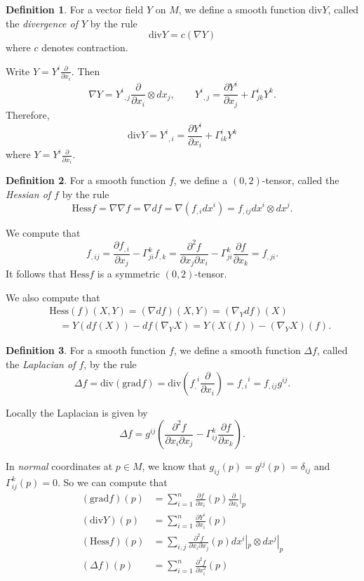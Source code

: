 \documentclass{amsart}
\numberwithin{equation}{section}
\theoremstyle{definition}
\newtheorem{definition}{Definition} [section]
\theoremstyle{theorem}
\begin{document}
\begin{definition}
For a vector field $Y$ on $M$, we define a smooth function $\text{div}Y$, called the {\em divergence of $Y$} by the rule 
\[
\text{div}Y = c(\nabla Y)
\]
where $c$ denotes contraction. 
\end{definition}

Write $Y=Y^i \frac{\partial}{\partial x_i}$. Then
$$
\nabla Y = {Y^i}_{,j} \frac{\partial}{\partial x_i}\otimes dx_j,\quad \quad {Y^i}_{,j} =\frac{\partial Y^i}{\partial x_j} + \Gamma^i_{jk}Y^k. 
$$
Therefore,
\[
\boxed{\text{div}Y = {Y^i}_{,i} = \frac{\partial Y^i}{\partial x_i} + \Gamma_{ik}^i Y^k}
\]
where  $Y = Y^i \frac{\partial}{\partial x_i}$. 

\begin{definition}
For a smooth function $f$, we define a $(0,2)$-tensor, called the {\em Hessian of $f$} by the rule 
\[
\text{Hess}f = \nabla \nabla f = \nabla df = \nabla(f_{,i}dx^i) = f_{,ij} dx^i \otimes dx^j.
\]
\end{definition}

We compute that 
\[
f_{,ij} = \frac{\partial f_{,i}}{\partial x_j} - \Gamma_{ji}^k f_{,k} = \frac{\partial^2f}{\partial x_j \partial x_i} - \Gamma_{ji}^k \frac{\partial f}{\partial x_k} = f_{,ji}.
\]
It follows that $\text{Hess}f$ is a symmetric $(0,2)$-tensor. 

We also compute that 
\begin{eqnarray*}
&& \text{Hess}(f)(X,Y) = (\nabla df)(X,Y) = (\nabla_Ydf)(X)\\
&&\quad = Y(df(X)) - df(\nabla_Y X) 
= Y(X(f)) - (\nabla_YX)(f).
\end{eqnarray*}

\begin{definition}
For a smooth function $f$, we define a smooth function $\Delta f$, called the {\em Laplacian of $f$}, by the rule 
\[
\Delta f = \text{div}(\text{grad} f)= \text{div}({f_,}^i \frac{\partial}{\partial x_i}) = {f_{,i}}^i = f_{,ij}g^{ij}. 
\]
\end{definition}

Locally the Laplacian is given by 
\[
\Delta f = g^{ij} \left(\frac{\partial^2f}{\partial x_i\partial x_j} - \Gamma_{ij}^k \frac{\partial f}{\partial x_k}\right).
\]

In \emph{normal} coordinates at $p \in M$, we know that $g_{ij}(p) = g^{ij}(p)=  \delta_{ij}$ and $\Gamma_{ij}^k(p) = 0$. So we can compute that 
\begin{align*}
(\text{grad}f)(p) &= \sum_{i=1}^n \frac{\partial f}{\partial x_i}(p) \frac{\partial}{\partial x_i}|_{p} \\
(\text{div} Y)(p) &= \sum_{i=1}^n \frac{\partial Y^i}{\partial x_i}(p) \\
(\text{Hess}f)(p) &= \sum_{i,j} \frac{\partial^2 f}{\partial x_i \partial x_j}(p) dx^i|_p \otimes dx^j|_p \\
(\Delta f)(p) &= \sum_{i=1}^n \frac{\partial^2 f}{\partial x_i^2}(p)
\end{align*}
\end{document}
